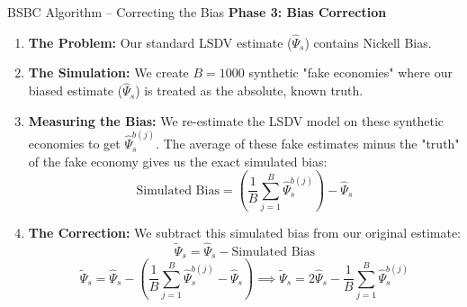 \documentclass[10pt, aspectratio=169]{beamer}
\begin{document}
\begin{frame}{BSBC Algorithm -- Correcting the Bias}
    \textbf{Phase 3: Bias Correction}
    
    \vspace{0.3em}
    \begin{enumerate}
        \item \textbf{The Problem:} Our standard LSDV estimate ($\hat{\Psi}_s$) contains Nickell Bias.
        \item \textbf{The Simulation:} We create $B=1000$ synthetic "fake economies" where our biased estimate ($\hat{\Psi}_s$) is treated as the absolute, known truth.
        \item \textbf{Measuring the Bias:} We re-estimate the LSDV model on these synthetic economies to get $\hat{\Psi}_s^{b(j)}$. The average of these fake estimates minus the "truth" of the fake economy gives us the exact simulated bias:
        \[ \text{Simulated Bias} = \left( \frac{1}{B}\sum_{j=1}^{B}\hat{\Psi}_s^{b(j)} \right) - \hat{\Psi}_s \]
        \item \textbf{The Correction:} We subtract this simulated bias from our original estimate:
        \[ \tilde{\Psi}_s = \hat{\Psi}_s - \text{Simulated Bias} \]
        \[ \tilde{\Psi}_s = \hat{\Psi}_s - \left( \frac{1}{B}\sum_{j=1}^{B}\hat{\Psi}_s^{b(j)} - \hat{\Psi}_s \right) \implies \boxed{\tilde{\Psi}_s = 2\hat{\Psi}_s - \frac{1}{B}\sum_{j=1}^{B}\hat{\Psi}_s^{b(j)}} \]
    \end{enumerate}
\end{frame}
\end{document}
